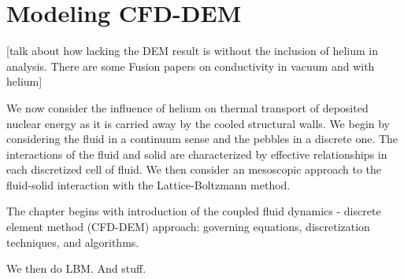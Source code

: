 \chapter{Modeling CFD-DEM} \label{sec:modeling-cfd-dem}
[talk about how lacking the DEM result is without the inclusion of helium in analysis. There are some Fusion papers on conductivity in vacuum and with helium]

We now consider the influence of helium on thermal transport of deposited nuclear energy as it is carried away by the cooled structural walls. We begin by considering the fluid in a continuum sense and the pebbles in a discrete one. The interactions of the fluid and solid are characterized by effective relationships in each discretized cell of fluid. We then consider an mesoscopic approach to the fluid-solid interaction with the Lattice-Boltzmann method. 

The chapter begins with introduction of the coupled fluid dynamics - discrete element method (CFD-DEM) approach: governing equations, discretization techniques, and algorithms.

We then do LBM. And stuff.



